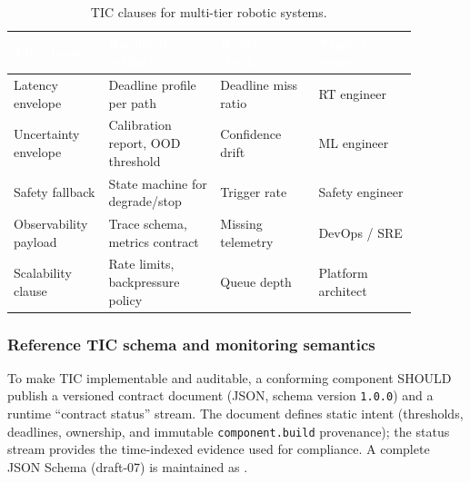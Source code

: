 \documentclass[smallextended]{svjour3}
\begin{document}
\begin{table}[htbp]
  \centering
  \caption{TIC clauses for multi-tier robotic systems.}
  \label{tab:tic}
  \renewcommand{\arraystretch}{1.15}
  \begin{tabular}{@{}L{0.19\linewidth}L{0.25\linewidth}L{0.22\linewidth}L{0.22\linewidth}@{}}
    \toprule
    \textcolor{white}{\textbf{TIC clause}} &
    \textcolor{white}{\textbf{Required artifact}} &
    \textcolor{white}{\textbf{Runtime check}} &
    \textcolor{white}{\textbf{Typical owner}} \\
    \midrule
    Latency envelope     & Deadline profile per path        & Deadline miss ratio & RT engineer \\
    Uncertainty envelope & Calibration report, OOD threshold & Confidence drift    & ML engineer \\
    Safety fallback      & State machine for degrade/stop    & Trigger rate        & Safety engineer \\
    Observability payload& Trace schema, metrics contract    & Missing telemetry   & DevOps / SRE \\
    Scalability clause   & Rate limits, backpressure policy  & Queue depth         & Platform architect \\
    \bottomrule
  \end{tabular}
  \renewcommand{\arraystretch}{1}
\end{table}

\FloatBarrier

\subsubsection{Reference TIC schema and monitoring semantics}
\label{sec:tic_schema}

To make TIC implementable and auditable, a conforming component SHOULD publish a
versioned contract document (JSON, schema version \texttt{1.0.0}) and a runtime
``contract status'' stream. The document defines static intent (thresholds, deadlines,
ownership, and immutable \texttt{component.build} provenance); the status stream provides
the time-indexed evidence used for compliance. A complete JSON Schema (draft-07) is
maintained as .
\end{document}
